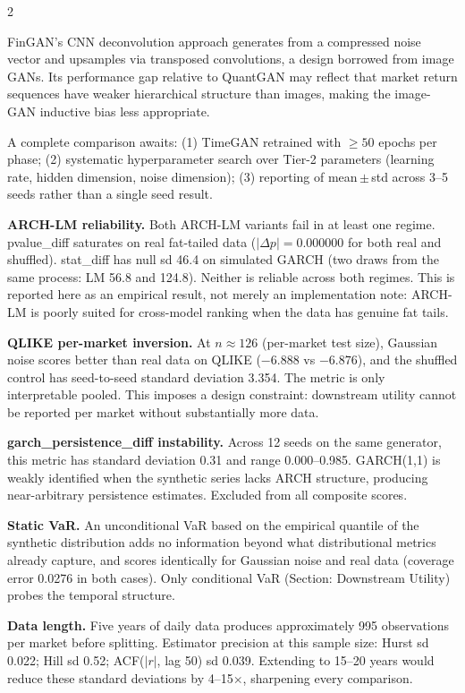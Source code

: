 \documentclass[10pt]{article}
\newcommand{\redbox}[2]{\begin{tcolorbox}[mybox={DRed}{RBg},title={#1}]#2\end{tcolorbox}}
\begin{document}
\begin{multicols}{2}
{FinGAN's CNN deconvolution approach generates from a compressed noise vector and upsamples via transposed convolutions, a design borrowed from image GANs. Its performance gap relative to QuantGAN may reflect that market return sequences have weaker hierarchical structure than images, making the image-GAN inductive bias less appropriate.

A complete comparison awaits: (1) TimeGAN retrained with $\geq 50$ epochs per phase; (2) systematic hyperparameter search over Tier-2 parameters (learning rate, hidden dimension, noise dimension); (3) reporting of mean\,$\pm$\,std across 3--5 seeds rather than a single seed result.}

\columnbreak

\redbox{Known Failure Modes and Limitations}{%
\textbf{ARCH-LM reliability.} Both ARCH-LM variants fail in at least one regime. pvalue\_diff saturates on real fat-tailed data ($|\Delta p| = 0.000000$ for both real and shuffled). stat\_diff has null sd 46.4 on simulated GARCH (two draws from the same process: LM 56.8 and 124.8). Neither is reliable across both regimes. This is reported here as an empirical result, not merely an implementation note: ARCH-LM is poorly suited for cross-model ranking when the data has genuine fat tails.

\textbf{QLIKE per-market inversion.} At $n\approx 126$ (per-market test size), Gaussian noise scores better than real data on QLIKE ($-6.888$ vs $-6.876$), and the shuffled control has seed-to-seed standard deviation 3.354. The metric is only interpretable pooled. This imposes a design constraint: downstream utility cannot be reported per market without substantially more data.

\textbf{garch\_persistence\_diff instability.} Across 12 seeds on the same generator, this metric has standard deviation 0.31 and range 0.000--0.985. GARCH(1,1) is weakly identified when the synthetic series lacks ARCH structure, producing near-arbitrary persistence estimates. Excluded from all composite scores.

\textbf{Static VaR.} An unconditional VaR based on the empirical quantile of the synthetic distribution adds no information beyond what distributional metrics already capture, and scores identically for Gaussian noise and real data (coverage error 0.0276 in both cases). Only conditional VaR (Section: Downstream Utility) probes the temporal structure.

\textbf{Data length.} Five years of daily data produces approximately 995 observations per market before splitting. Estimator precision at this sample size: Hurst sd 0.022; Hill sd 0.52; ACF($|r|$, lag 50) sd 0.039. Extending to 15--20 years would reduce these standard deviations by 4--15$\times$, sharpening every comparison.}


\end{multicols}
\end{document}
